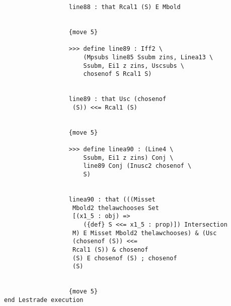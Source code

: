 \documentclass[12pt]{article}
\begin{document}
\begin{verbatim}
                  line88 : that Rcal1 (S) E Mbold


                  {move 5}

                  >>> define line89 : Iff2 \
                      (Mpsubs line85 Ssubm zins, Linea13 \
                      Ssubm, Ei1 z zins, Uscsubs \
                      chosenof S Rcal1 S)


                  line89 : that Usc (chosenof 
                   (S)) <<= Rcal1 (S)


                  {move 5}

                  >>> define linea90 : (Line4 \
                      Ssubm, Ei1 z zins) Conj \
                      line89 Conj (Inusc2 chosenof \
                      S)


                  linea90 : that (((Misset 
                   Mbold2 thelawchooses Set 
                   [(x1_5 : obj) => 
                      ({def} S <<= x1_5 : prop)]) Intersection 
                   M) E Misset Mbold2 thelawchooses) & (Usc 
                   (chosenof (S)) <<= 
                   Rcal1 (S)) & chosenof 
                   (S) E chosenof (S) ; chosenof 
                   (S)


                  {move 5}
end Lestrade execution

\end{verbatim}
\end{document}
